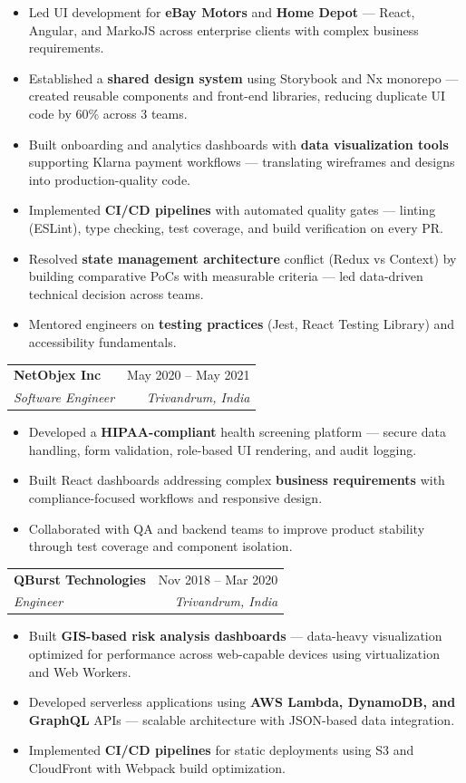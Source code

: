 \documentclass[11pt,a4paper]{article}
\makeatletter
\newcommand{\job}[4]{
\vspace{4pt}
\begin{tabular*}{\textwidth}{l@{\extracolsep{\fill}}r}
\textbf{#1} & #2 \\
\textit{#3} & \textit{#4} \\
\end{tabular*}
\vspace{2pt}
}
\makeatother
\begin{document}
\begin{itemize}
\item Led UI development for \textbf{eBay Motors} and \textbf{Home Depot} — React, Angular, and MarkoJS across enterprise clients with complex business requirements.
\item Established a \textbf{shared design system} using Storybook and Nx monorepo — created reusable components and front-end libraries, reducing duplicate UI code by 60\% across 3 teams.
\item Built onboarding and analytics dashboards with \textbf{data visualization tools} supporting Klarna payment workflows — translating wireframes and designs into production-quality code.
\item Implemented \textbf{CI/CD pipelines} with automated quality gates — linting (ESLint), type checking, test coverage, and build verification on every PR.
\item Resolved \textbf{state management architecture} conflict (Redux vs Context) by building comparative PoCs with measurable criteria — led data-driven technical decision across teams.
\item Mentored engineers on \textbf{testing practices} (Jest, React Testing Library) and accessibility fundamentals.
\end{itemize}

\job
{NetObjex Inc}
{May 2020 -- May 2021}
{Software Engineer}
{Trivandrum, India}

\begin{itemize}
\item Developed a \textbf{HIPAA-compliant} health screening platform — secure data handling, form validation, role-based UI rendering, and audit logging.
\item Built React dashboards addressing complex \textbf{business requirements} with compliance-focused workflows and responsive design.
\item Collaborated with QA and backend teams to improve product stability through test coverage and component isolation.
\end{itemize}

\job
{QBurst Technologies}
{Nov 2018 -- Mar 2020}
{Engineer}
{Trivandrum, India}

\begin{itemize}
\item Built \textbf{GIS-based risk analysis dashboards} — data-heavy visualization optimized for performance across web-capable devices using virtualization and Web Workers.
\item Developed serverless applications using \textbf{AWS Lambda, DynamoDB, and GraphQL} APIs — scalable architecture with JSON-based data integration.
\item Implemented \textbf{CI/CD pipelines} for static deployments using S3 and CloudFront with Webpack build optimization.
\end{itemize}
\end{document}
